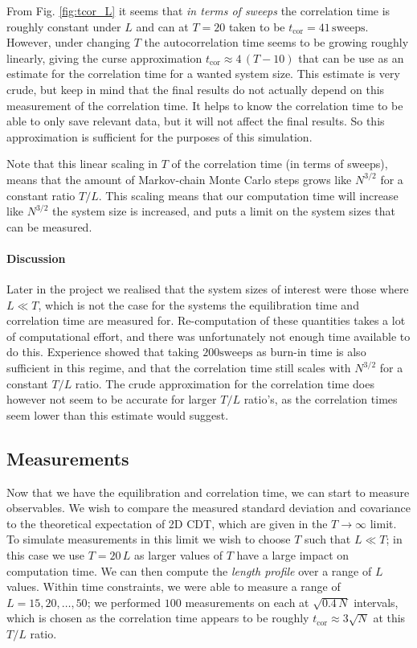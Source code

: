 From Fig. \ref{fig:tcor_L} it seems that \emph{in terms of sweeps} the correlation time is roughly constant under $L$ and can at $T = 20$ taken to be $t_\text{cor} = 41 \, \text{sweeps}$.
However, under changing $T$ the autocorrelation time seems to be growing roughly linearly, giving the curse approximation $t_\text{cor} \approx 4\, (T - 10)$ that can be use as an estimate for the correlation time for a wanted system size.
This estimate is very crude, but keep in mind that the final results do not actually depend on this measurement of the correlation time. It helps to know the correlation time to be able to only save relevant data, but it will not affect the final results.
So this approximation is sufficient for the purposes of this simulation.

Note that this linear scaling in $T$ of the correlation time (in terms of sweeps), means that the amount of Markov-chain Monte Carlo steps grows like $N^{3/2}$ for a constant ratio $T/L$. This scaling means that our computation time will increase like $N^{3/2}$ the system size is increased, and puts a limit on the system sizes that can be measured.

\paragraph{Discussion} Later in the project we realised that the system sizes of interest were those where $L \ll T$, which is not the case for the systems the equilibration time and correlation time are measured for.
Re-computation of these quantities takes a lot of computational effort, and there was unfortunately not enough time available to do this.
Experience showed that taking $200 \text{sweeps}$ as burn-in time is also sufficient in this regime, and that the correlation time still scales with $N^{3/2}$ for a constant $T/L$ ratio.
The crude approximation for the correlation time does however not seem to be accurate for larger $T/L$ ratio's, as the correlation times seem lower than this estimate would suggest.


\subsection{Measurements}
Now that we have the equilibration and correlation time, we can start to measure observables.
We wish to compare the measured standard deviation and covariance to the theoretical expectation of 2D CDT, which are given in the $T \rightarrow \infty$ limit.
To simulate measurements in this limit we wish to choose $T$ such that $L \ll T$; in this case we use $T = 20 \, L$ as larger values of $T$ have a large impact on computation time.
We can then compute the \emph{length profile} over a range of $L$ values.
Within time constraints, we were able to measure a range of $L = 15, 20, \dots, 50$; we performed $100$ measurements on each at $\sqrt{0.4 \, N}$ intervals, which is chosen as the correlation time appears to be roughly $t_\text{cor} \approx 3 \sqrt{N}$ at this $T/L$ ratio.

